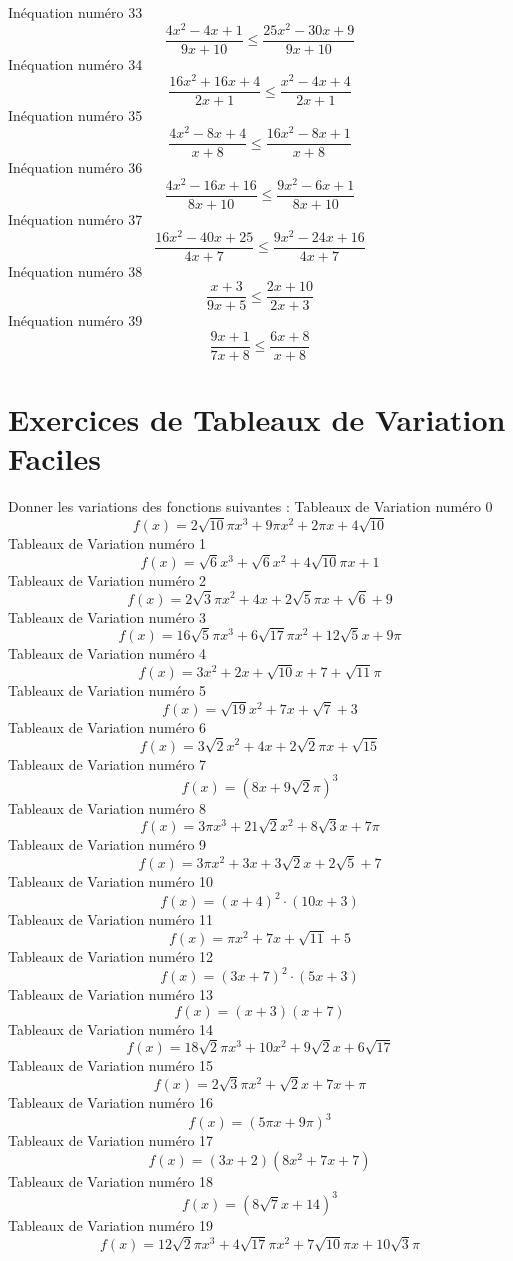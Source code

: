 \documentclass{article}
\begin{document}
\]In\'equation num\'ero 33 \[\frac{4 x^{2} - 4 x + 1}{9 x + 10} \leq \frac{25 x^{2} - 30 x + 9}{9 x + 10}\]In\'equation num\'ero 34 \[\frac{16 x^{2} + 16 x + 4}{2 x + 1} \leq \frac{x^{2} - 4 x + 4}{2 x + 1}\]In\'equation num\'ero 35 \[\frac{4 x^{2} - 8 x + 4}{x + 8} \leq \frac{16 x^{2} - 8 x + 1}{x + 8}\]In\'equation num\'ero 36 \[\frac{4 x^{2} - 16 x + 16}{8 x + 10} \leq \frac{9 x^{2} - 6 x + 1}{8 x + 10}\]In\'equation num\'ero 37 \[\frac{16 x^{2} - 40 x + 25}{4 x + 7} \leq \frac{9 x^{2} - 24 x + 16}{4 x + 7}\]In\'equation num\'ero 38 \[\frac{x + 3}{9 x + 5} \leq \frac{2 x + 10}{2 x + 3}\]In\'equation num\'ero 39 \[\frac{9 x + 1}{7 x + 8} \leq \frac{6 x + 8}{x + 8}\]
 \section{Exercices de Tableaux de Variation Faciles}

 Donner les variations des fonctions suivantes : 
Tableaux de Variation num\'ero 0 \[f(x) = 2 \sqrt{10} \pi x^{3} + 9 \pi x^{2} + 2 \pi x + 4 \sqrt{10}\]Tableaux de Variation num\'ero 1 \[f(x) = \sqrt{6} x^{3} + \sqrt{6} x^{2} + 4 \sqrt{10} \pi x + 1\]Tableaux de Variation num\'ero 2 \[f(x) = 2 \sqrt{3} \pi x^{2} + 4 x + 2 \sqrt{5} \pi x + \sqrt{6} + 9\]Tableaux de Variation num\'ero 3 \[f(x) = 16 \sqrt{5} \pi x^{3} + 6 \sqrt{17} \pi x^{2} + 12 \sqrt{5} x + 9 \pi\]Tableaux de Variation num\'ero 4 \[f(x) = 3 x^{2} + 2 x + \sqrt{10} x + 7 + \sqrt{11} \pi\]Tableaux de Variation num\'ero 5 \[f(x) = \sqrt{19} x^{2} + 7 x + \sqrt{7} + 3\]Tableaux de Variation num\'ero 6 \[f(x) = 3 \sqrt{2} x^{2} + 4 x + 2 \sqrt{2} \pi x + \sqrt{15}\]Tableaux de Variation num\'ero 7 \[f(x) = \left(8 x + 9 \sqrt{2} \pi\right)^{3}\]Tableaux de Variation num\'ero 8 \[f(x) = 3 \pi x^{3} + 21 \sqrt{2} x^{2} + 8 \sqrt{3} x + 7 \pi\]Tableaux de Variation num\'ero 9 \[f(x) = 3 \pi x^{2} + 3 x + 3 \sqrt{2} x + 2 \sqrt{5} + 7\]Tableaux de Variation num\'ero 10 \[f(x) = \left(x + 4\right)^{2} \cdot \left(10 x + 3\right)\]Tableaux de Variation num\'ero 11 \[f(x) = \pi x^{2} + 7 x + \sqrt{11} + 5\]Tableaux de Variation num\'ero 12 \[f(x) = \left(3 x + 7\right)^{2} \cdot \left(5 x + 3\right)\]Tableaux de Variation num\'ero 13 \[f(x) = \left(x + 3\right) \left(x + 7\right)\]Tableaux de Variation num\'ero 14 \[f(x) = 18 \sqrt{2} \pi x^{3} + 10 x^{2} + 9 \sqrt{2} x + 6 \sqrt{17}\]Tableaux de Variation num\'ero 15 \[f(x) = 2 \sqrt{3} \pi x^{2} + \sqrt{2} x + 7 x + \pi\]Tableaux de Variation num\'ero 16 \[f(x) = \left(5 \pi x + 9 \pi\right)^{3}\]Tableaux de Variation num\'ero 17 \[f(x) = \left(3 x + 2\right) \left(8 x^{2} + 7 x + 7\right)\]Tableaux de Variation num\'ero 18 \[f(x) = \left(8 \sqrt{7} x + 14\right)^{3}\]Tableaux de Variation num\'ero 19 \[f(x) = 12 \sqrt{2} \pi x^{3} + 4 \sqrt{17} \pi x^{2} + 7 \sqrt{10} \pi x + 10 \sqrt{3} \pi\]
\end{document}
